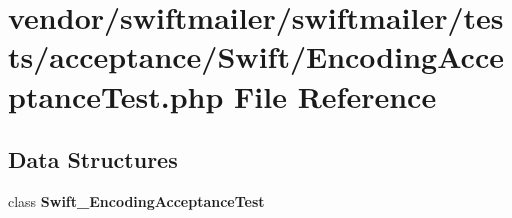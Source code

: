 \section{vendor/swiftmailer/swiftmailer/tests/acceptance/\+Swift/\+Encoding\+Acceptance\+Test.php File Reference}
\label{_encoding_acceptance_test_8php}
\subsection*{Data Structures}
\begin{DoxyCompactItemize}
\item 
class {\bf Swift\+\_\+\+Encoding\+Acceptance\+Test}
\end{DoxyCompactItemize}
